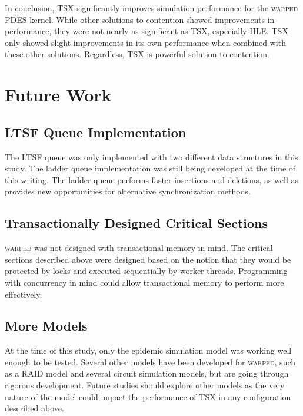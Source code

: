 \documentclass[11pt]{book}
\begin{document}
In conclusion, TSX significantly improves simulation performance for the \textsc{warped}
PDES kernel.  While other solutions to contention showed improvements in
performance, they were not nearly as significant as TSX, especially HLE.  TSX only
showed slight improvements in its own performance when combined with these other
solutions.  Regardless, TSX is powerful solution to contention. 

\section{Future Work}

\subsection{LTSF Queue Implementation}

The LTSF queue was only implemented with two different data structures in this study.  The
ladder queue implementation was still being developed at the time of this writing.  The
ladder queue performs faster insertions and deletions, as well as provides new
opportunities for alternative synchronization methods.

\subsection{Transactionally Designed Critical Sections}

\textsc{warped} was not designed with transactional memory in mind.  The
critical sections described above were designed based on the notion that they
would be protected by locks and executed sequentially by worker threads.
Programming with concurrency in mind could allow transactional memory to perform
more effectively.

\subsection{More Models}

At the time of this study, only the epidemic simulation model was working well enough to
be tested.  Several other models have been developed for \textsc{warped}, such as a RAID
model and several circuit simulation models, but are going through rigorous development.
Future studies should explore other models as the very nature of the model could impact
the performance of TSX in any configuration described above.

\newpage


\end{document}
